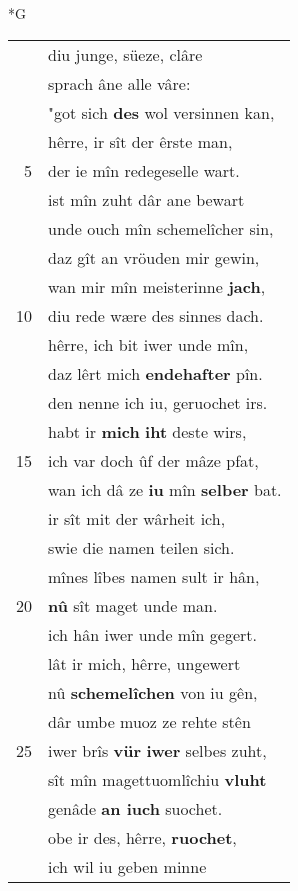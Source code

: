 \documentclass[8pt,a4paper,notitlepage]{article}
\begin{document}
\begin{table}[ht]
\begin{minipage}[t]{0.5\linewidth}
\small
\begin{center}*G
\end{center}
\begin{tabular}{rl}
 & diu junge, süeze, clâre\\ 
 & sprach âne alle vâre:\\ 
 & "got sich \textbf{des} wol versinnen kan,\\ 
 & hêrre, ir sît der êrste man,\\ 
5 & der ie mîn redegeselle wart.\\ 
 & ist mîn zuht dâr ane bewart\\ 
 & unde ouch mîn schemelîcher sin,\\ 
 & daz gît an vröuden mir gewin,\\ 
 & wan mir mîn meisterinne \textbf{jach},\\ 
10 & diu rede wære des sinnes dach.\\ 
 & hêrre, ich bit iwer unde mîn,\\ 
 & daz lêrt mich \textbf{endehafter} pîn.\\ 
 & den nenne ich iu, geruochet irs.\\ 
 & habt ir \textbf{mich} \textbf{iht} deste wirs,\\ 
15 & ich var doch ûf der mâze pfat,\\ 
 & wan ich dâ ze \textbf{iu} mîn \textbf{selber} bat.\\ 
 & ir sît mit der wârheit ich,\\ 
 & swie die namen teilen sich.\\ 
 & mînes lîbes namen sult ir hân,\\ 
20 & \textbf{nû} sît maget unde man.\\ 
 & ich hân iwer unde mîn gegert.\\ 
 & lât ir mich, hêrre, ungewert\\ 
 & nû \textbf{schemelîchen} von iu gên,\\ 
 & dâr umbe muoz ze rehte stên\\ 
25 & iwer brîs \textbf{vür} \textbf{iwer} selbes zuht,\\ 
 & sît mîn magettuomlîchiu \textbf{vluht}\\ 
 & genâde \textbf{an iuch} suochet.\\ 
 & obe ir des, hêrre, \textbf{ruochet},\\ 
 & ich wil iu geben minne\\ 

\end{tabular}
\end{minipage}
\end{table}
\end{document}
